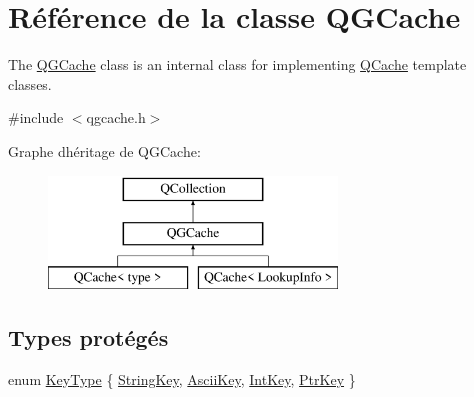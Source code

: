 \hypertarget{class_q_g_cache}{}\section{Référence de la classe Q\+G\+Cache}
\label{class_q_g_cache}


The \hyperlink{class_q_g_cache}{Q\+G\+Cache} class is an internal class for implementing \hyperlink{class_q_cache}{Q\+Cache} template classes.  




{\ttfamily \#include $<$qgcache.\+h$>$}

Graphe d\textquotesingle{}héritage de Q\+G\+Cache\+:\begin{figure}[H]
\begin{center}
\leavevmode
\includegraphics[height=3.000000cm]{class_q_g_cache}
\end{center}
\end{figure}
\subsection*{Types protégés}
\begin{DoxyCompactItemize}
\item 
enum \hyperlink{class_q_g_cache_a1dcb303ef4795be3117374c386c5574a}{Key\+Type} \{ \hyperlink{class_q_g_cache_a1dcb303ef4795be3117374c386c5574aa2472087ab1f78be15986e5e2b6cb1ef0}{String\+Key}, 
\hyperlink{class_q_g_cache_a1dcb303ef4795be3117374c386c5574aa5bcd941ba61a2218d5433b2a50cc0582}{Ascii\+Key}, 
\hyperlink{class_q_g_cache_a1dcb303ef4795be3117374c386c5574aa84c6761d9e7f494b1d43b6b6760ec2b5}{Int\+Key}, 
\hyperlink{class_q_g_cache_a1dcb303ef4795be3117374c386c5574aa8c2fd7732118638d4c5212f547aae9ca}{Ptr\+Key}
 \}
\end{DoxyCompactItemize}
